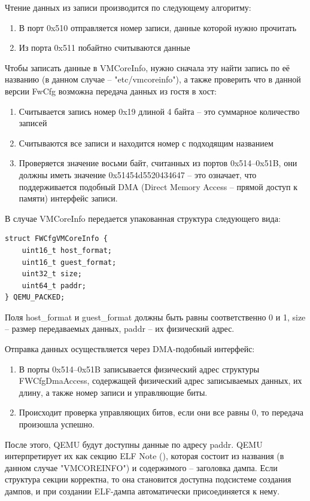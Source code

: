 \documentclass{mipt-thesis-bs}
\begin{document}
Чтение данных из записи производится по следующему алгоритму:
\begin{enumerate}
\item В порт 0x510 отправляется номер записи, данные которой нужно прочитать
\item Из порта 0x511 побайтно считываются данные
\end{enumerate}

Чтобы записать данные в VMCoreInfo, нужно сначала эту найти запись по её названию (в данном случае -- "etc/vmcoreinfo"), а также проверить что в данной версии FwCfg возможна передача данных из гостя в хост:

\begin{enumerate}
\item Считывается запись номер 0x19 длиной 4 байта -- это суммарное количество записей
\item Считываются все записи и находится номер с подходящим названием
\item Проверяется значение восьми байт, считанных из портов 0x514--0x51B, они должны иметь значение 0x51454d5520434647 -- это означает, что поддерживается подобный DMA (Direct Memory Access -- прямой доступ к памяти) интерфейс записи.
\end{enumerate}

В случае VMCoreInfo передается упакованная структура следующего вида:

\begin{verbatim}
struct FWCfgVMCoreInfo {
    uint16_t host_format;
    uint16_t guest_format;
    uint32_t size;
    uint64_t paddr;
} QEMU_PACKED;
\end{verbatim}

Поля host{\_}format и guest{\_}format должны быть равны соответственно 0 и 1, size -- размер передаваемых данных, paddr -- их физический адрес.

Отправка данных осуществляется через DMA-подобный интерфейс:

\begin{enumerate}
\item В порты 0x514--0x51B записывается физический адрес структуры FWCfgDmaAccess, содержащей физический адрес записываемых данных, их длину, а также номер записи и управляющие биты.
\item Происходит проверка управляющих битов, если они все равны 0, то передача произошла успешно.
\end{enumerate}

После этого, QEMU будут доступны данные по адресу paddr. QEMU интерпретирует их как секцию ELF Note (), которая состоит из названия (в данном случае "VMCOREINFO") и содержимого -- заголовка дампа\cite{elfspec}. Если структура секции корректна, то она становится доступна подсистеме создания дампов, и при создании ELF-дампа автоматически присоединяется к нему.
\end{document}

